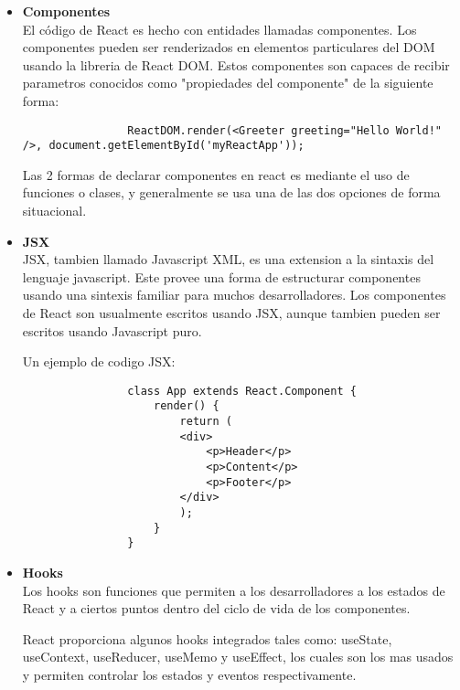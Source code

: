         \begin{itemize}
            \item \textbf{Componentes} \hfill \\

            El código de React es hecho con entidades llamadas componentes. Los componentes pueden ser renderizados en elementos particulares del DOM usando la libreria de React DOM. Estos componentes son capaces de recibir parametros conocidos como "propiedades del componente" de la siguiente forma: \hfill \\

            \begin{lstlisting}
                ReactDOM.render(<Greeter greeting="Hello World!" />, document.getElementById('myReactApp'));
            \end{lstlisting}

            Las 2 formas de declarar componentes en react es mediante el uso de funciones o clases, y generalmente se usa una de las dos opciones de forma situacional.

            \item \textbf{JSX} \hfill \\

            JSX, tambien llamado Javascript XML, es una extension a la sintaxis del lenguaje javascript. Este provee una forma de estructurar componentes usando una sintexis familiar para muchos desarrolladores. Los componentes de React son usualmente escritos usando JSX, aunque tambien pueden ser escritos usando Javascript puro.

            Un ejemplo de codigo JSX:

            \begin{lstlisting}
                class App extends React.Component {
                    render() {
                        return (
                        <div>
                            <p>Header</p>
                            <p>Content</p>
                            <p>Footer</p>
                        </div>
                        );
                    }
                }
            \end{lstlisting}

            \item \textbf{Hooks} \hfill \\

            Los hooks son funciones que permiten a los desarrolladores  a los estados de React y a ciertos puntos dentro del ciclo de vida de los componentes.

            React proporciona algunos hooks integrados tales como: useState, useContext, useReducer, useMemo y useEffect, los cuales son los mas usados y permiten controlar los estados y eventos respectivamente.


        \end{itemize}
        
